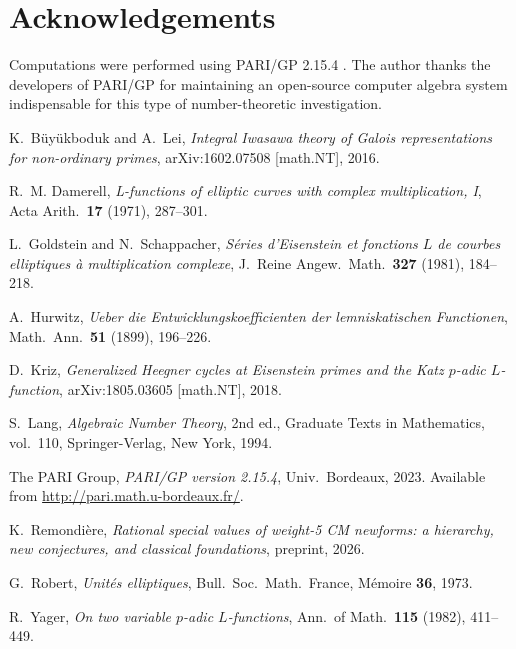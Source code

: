 \documentclass[12pt]{amsart}
\theoremstyle{definition}
\newcommand{\CiteNeeded}[1]{}
\begin{document}
\section*{Acknowledgements}

Computations were performed using PARI/GP 2.15.4 \cite{PARI}.
The author thanks the developers of PARI/GP for maintaining an open-source
computer algebra system indispensable for this type of number-theoretic
investigation.

\begin{thebibliography}{99}

K.~Büyükboduk and A.~Lei,
\emph{Integral Iwasawa theory of Galois representations for non-ordinary
primes},
arXiv:1602.07508 [math.NT], 2016.

R.~M. Damerell,
\emph{L-functions of elliptic curves with complex multiplication, I},
Acta Arith.\ \textbf{17} (1971), 287--301.
\CiteNeeded{Pre-arXiv; verify via NUMDAM or Acta Arith.\ archive.}

L.~Goldstein and N.~Schappacher,
\emph{Séries d'Eisenstein et fonctions $L$ de courbes elliptiques à
multiplication complexe},
J.~Reine Angew.\ Math.\ \textbf{327} (1981), 184--218.
\CiteNeeded{Pre-arXiv; verify via Crelle archive.}

A.~Hurwitz,
\emph{Ueber die Entwicklungskoefficienten der lemniskatischen Functionen},
Math.\ Ann.\ \textbf{51} (1899), 196--226.
\CiteNeeded{Pre-arXiv classical reference; available via GDZ digitisation.}

D.~Kriz,
\emph{Generalized Heegner cycles at Eisenstein primes and the Katz
$p$-adic $L$-function},
arXiv:1805.03605 [math.NT], 2018.

S.~Lang,
\emph{Algebraic Number Theory}, 2nd ed.,
Graduate Texts in Mathematics, vol.~110,
Springer-Verlag, New York, 1994.
\CiteNeeded{In particular Chap.~XII \S2 on Hecke characters and CM theory.}

The PARI Group,
\emph{PARI/GP version 2.15.4},
Univ.\ Bordeaux, 2023.
Available from \url{http://pari.math.u-bordeaux.fr/}.

K.~Remondière,
\emph{Rational special values of weight-5 CM newforms: a hierarchy,
new conjectures, and classical foundations},
preprint, 2026.

G.~Robert,
\emph{Unités elliptiques},
Bull.\ Soc.\ Math.\ France, Mémoire \textbf{36}, 1973.
\CiteNeeded{Pre-arXiv; Chapter~3 on lattice sums and Bernoulli--Hurwitz numbers.}

R.~Yager,
\emph{On two variable $p$-adic $L$-functions},
Ann.\ of Math.\ \textbf{115} (1982), 411--449.
\CiteNeeded{Pre-arXiv; verify via Annals archive.}

\end{thebibliography}
\end{document}
